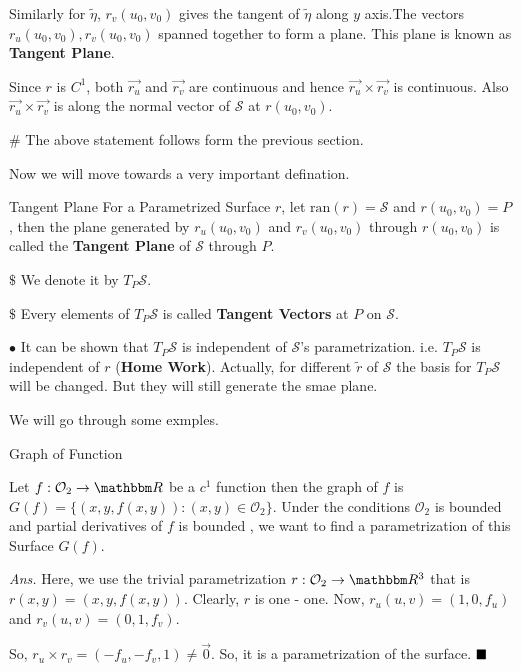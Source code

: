 \documentclass[Analysis-3]{subfiles}
\begin{document}
\vspace{0.2cm}

Similarly for $\tilde{\eta}$, $r_v(u_0,v_0)$  gives the tangent of $\tilde{\eta}$ along $y$ axis.The vectors $r_u(u_0,v_0),r_v(u_0,v_0)$ spanned together to form a plane. This plane is known as \textbf{Tangent Plane}.

\vspace{0.2cm}

Since $r$ is $C^1$, both $\vec{r_u}$ and $\vec{r_v}$ are continuous and hence $\vec{r_u} \times \vec{r_v}$ is continuous. Also $\vec{r_u} \times \vec{r_v}$ is along the normal vector of $\mathcal{S}$ at $r(u_0,v_0)$.

\vspace{0.2cm}

$\#$ The above statement follows form the previous section. 

Now we will move towards a very important defination.

\begin{Def}{Tangent Plane}{}
    For a Parametrized Surface $r$, let $\text{ran}(r)=\mathcal{S}$ and $r(u_0,v_0)=P$, then the plane generated by $r_u(u_0,v_0)$ and $r_v(u_0,v_0)$ through $r(u_0,v_0)$ is called the \textbf{Tangent Plane} of $\mathcal{S}$ through $P$. 
    
    \vspace{0.2cm}

    $\$$ We denote it by $T_P\mathcal{S}$.

    $\$$ Every elements of $T_P\mathcal{S}$ is called \textbf{Tangent Vectors} at $P$ on $\mathcal{S}$.
\end{Def}

$\bullet$ It can be shown that $T_P\mathcal{S}$ is independent of $\mathcal{S}$'s parametrization. i.e. $T_P\mathcal{S}$ is independent of $r$ (\textbf{Home Work}). Actually, for different $\tilde{r}$ of $\mathcal{S}$ the basis for $T_P\mathcal{S}$ will be changed. But they will still generate the smae plane.

\vspace{0.2cm}

We will go through some exmples.

\begin{Eg}{Graph of Function}{}\label{eg:grp}
  
    Let $f : \mathcal{O}_2 \to \R$ be a $c^1$ function then the graph of $f$ is $G(f) = \{ (x,y,f(x,y)) : (x,y)\in \mathcal{O}_2\}$. Under the conditions $\mathcal{O}_2$ is bounded and partial derivatives of $f$ is bounded , we want to find a parametrization of this Surface $G(f)$. 
      
    \vspace{0.2cm}

    \textit{Ans.} Here, we use the trivial parametrization $r : \mathcal{O}_2 \to \R^3$ that is $ r(x,y) = (x,y,f(x,y))$. Clearly, $r$ is one - one. Now, $r_u(u,v) = (1,0,f_u)$ and $r_v(u,v) = (0,1,f_v)$. 

    \vspace{0.2cm}

    So, $ r_u \times r_v = (-f_u,-f_v,1) \neq \vec{0}$. So, it is a parametrization of the surface. $\hfill \blacksquare$
\end{Eg}
\end{document}
